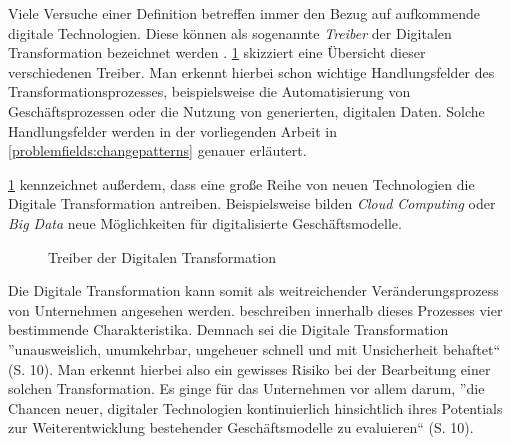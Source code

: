 Viele Versuche einer Definition betreffen immer den Bezug auf aufkommende digitale Technologien. Diese können als sogenannte \textit{Treiber} der Digitalen Transformation bezeichnet werden \cite[S.20]{bloching_digitale_2015}. \ref{fig:bigpicture} skizziert eine Übersicht dieser verschiedenen Treiber. Man erkennt hierbei schon wichtige Handlungsfelder des Transformationsprozesses, beispielsweise die Automatisierung von Geschäftsprozessen oder die Nutzung von generierten, digitalen Daten. Solche Handlungsfelder werden in der vorliegenden Arbeit in \ref{problemfields:changepatterns} genauer erläutert.
 
\ref{fig:bigpicture} kennzeichnet außerdem, dass eine große Reihe von neuen Technologien die Digitale Transformation antreiben. Beispielsweise bilden \textit{Cloud Computing} oder \textit{Big Data} neue Möglichkeiten für digitalisierte Geschäftsmodelle. 
 
\begin{figure}[H]
	\centering
	\caption[Big-Picture der Digitalen Transformation]{Treiber der Digitalen Transformation \protect \cite[S. 20]{bloching_digitale_2015}}
	\label{fig:bigpicture}
\end{figure}

Die Digitale Transformation kann somit als weitreichender Veränderungsprozess von Unternehmen angesehen werden.  beschreiben innerhalb dieses Prozesses vier bestimmende Charakteristika. Demnach sei die Digitale Transformation ''unausweislich, unumkehrbar, ungeheuer schnell und mit Unsicherheit behaftet`` (S. 10). Man erkennt hierbei also ein gewisses Risiko bei der Bearbeitung einer solchen Transformation. Es ginge für das Unternehmen vor allem darum, ''die Chancen neuer, digitaler Technologien kontinuierlich hinsichtlich ihres Potentials zur Weiterentwicklung bestehender Geschäftsmodelle zu evaluieren`` (S. 10).


